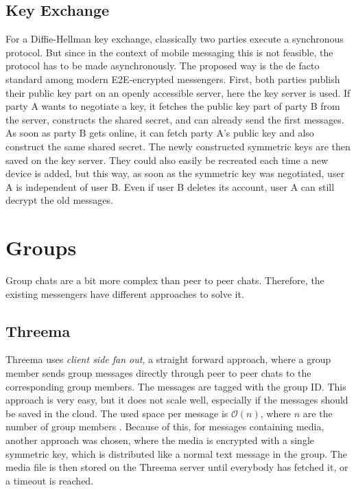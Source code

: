 \documentclass[a4paper, oneside]{discothesis}
\begin{document}
\subsection{Key Exchange}

For a Diffie-Hellman key exchange, classically two parties execute a synchronous protocol. But since in the context of mobile messaging this is not feasible, the protocol has to be made asynchronously. The proposed way is the de facto standard among modern E2E-encrypted messengers. First, both parties publish their public key part on an openly accessible server, here the key server is used. If party A wants to negotiate a key, it fetches the public key part of party B from the server, constructs the shared secret, and can already send the first messages. As soon as party B gets online, it can fetch party A's public key and also construct the same shared secret. The newly constructed symmetric keys are then saved on the key server. They could also easily be recreated each time a new device is added, but this way, as soon as the symmetric key was negotiated, user A is independent of user B. Even if user B deletes its account, user A can still decrypt the old messages.

\section{Groups}

Group chats are a bit more complex than peer to peer chats. Therefore, the existing messengers have different approaches to solve it.

\subsection{Threema}

Threema uses \emph{client side fan out}, a straight forward approach, where a group member sends group messages directly through peer to peer chats to the corresponding group members. The messages are tagged with the group ID. This approach is very easy, but it does not scale well, especially if the messages should be saved in the cloud. The used space per message is $\mathcal{O}(n)$, where $n$ are the number of group members \cite{Threema}. Because of this, for messages containing media, another approach was chosen, where the media is encrypted with a single symmetric key, which is distributed like a normal text message in the group. The media file is then stored on the Threema server until everybody has fetched it, or a timeout is reached.
\end{document}
